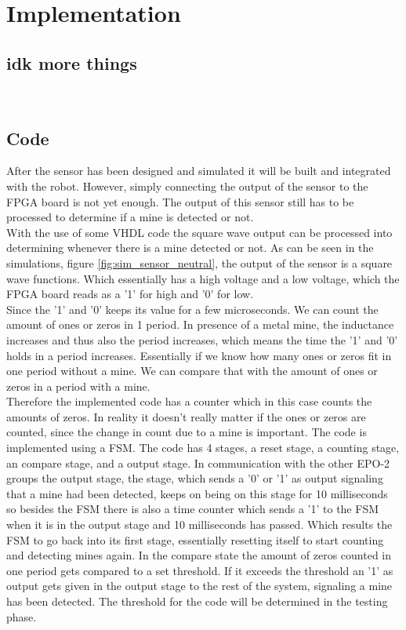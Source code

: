 \newpage
\section{Implementation}
\subsection{idk more things}
\\

\subsection{Code}
After the sensor has been designed and simulated it will be built and integrated with the robot.
However, simply connecting the output of the sensor to the FPGA board is not yet enough. The output of this sensor still has to be processed to determine if a mine is detected or not.\\
With the use of some VHDL code the square wave output can be processed into determining whenever there is a mine detected or not.
As can be seen in the simulations, figure \ref{fig:sim_sensor_neutral}, the output of the sensor is a square wave functions. Which essentially has a high voltage and a low voltage, which the FPGA board reads as a '1' for high and '0' for low.\\
Since the '1' and '0' keeps its value for a few microseconds. We can count the amount of ones or zeros in 1 period. In presence of a metal mine, the inductance increases and thus also the period increases, which means the time the '1' and '0' holds in a period increases. Essentially if we know how many ones or zeros fit in one period without a mine. We can compare that with the amount of ones or zeros in a period with a mine. \\

Therefore the implemented code has a counter which in this case counts the amounts of zeros. In reality it doesn't really matter if the ones or zeros are counted, since the change in count due to a mine is important. The code is implemented using a FSM. The code has 4 stages, a reset stage, a counting stage, an compare stage, and a output stage. In communication with the other EPO-2 groups the output stage, the stage, which sends a '0' or '1' as output signaling that a mine had been detected, keeps on being on this stage for 10 milliseconds %
so besides the FSM there is also a time counter which sends a '1' to the FSM when it is in the output stage and 10 milliseconds has passed. Which results the FSM to go back into its first stage, essentially resetting itself to start counting and detecting mines again. In the compare state the amount of zeros counted in one period gets compared to a set threshold. If it exceeds the threshold an '1' as output gets given in the output stage to the rest of the system, signaling a mine has been detected. The threshold for the code will be determined in the testing phase.

